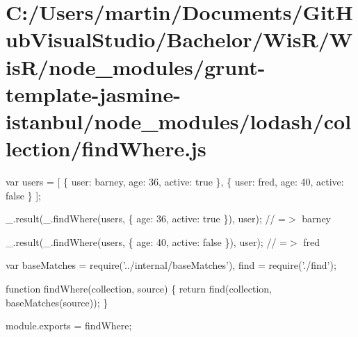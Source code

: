 \hypertarget{_c_1_2_users_2martin_2_documents_2_git_hub_visual_studio_2_bachelor_2_wis_r_2_wis_r_2node_modulebb9a610d07bdfadc7a7de5fedd69f873}{}\section{C\+:/\+Users/martin/\+Documents/\+Git\+Hub\+Visual\+Studio/\+Bachelor/\+Wis\+R/\+Wis\+R/node\+\_\+modules/grunt-\/template-\/jasmine-\/istanbul/node\+\_\+modules/lodash/collection/find\+Where.\+js}
var users = \mbox{[} \{ \textquotesingle{}user\textquotesingle{}\+: \textquotesingle{}barney\textquotesingle{}, \textquotesingle{}age\textquotesingle{}\+: 36, \textquotesingle{}active\textquotesingle{}\+: true \}, \{ \textquotesingle{}user\textquotesingle{}\+: \textquotesingle{}fred\textquotesingle{}, \textquotesingle{}age\textquotesingle{}\+: 40, \textquotesingle{}active\textquotesingle{}\+: false \} \mbox{]};

\+\_\+.\+result(\+\_\+.\+find\+Where(users, \{ \textquotesingle{}age\textquotesingle{}\+: 36, \textquotesingle{}active\textquotesingle{}\+: true \}), \textquotesingle{}user\textquotesingle{}); // =$>$ \textquotesingle{}barney\textquotesingle{}

\+\_\+.\+result(\+\_\+.\+find\+Where(users, \{ \textquotesingle{}age\textquotesingle{}\+: 40, \textquotesingle{}active\textquotesingle{}\+: false \}), \textquotesingle{}user\textquotesingle{}); // =$>$ \textquotesingle{}fred\textquotesingle{}


\begin{DoxyCodeInclude}
var baseMatches = require(\textcolor{stringliteral}{'../internal/baseMatches'}),
    find = require(\textcolor{stringliteral}{'./find'});

\textcolor{keyword}{function} findWhere(collection, source) \{
  \textcolor{keywordflow}{return} find(collection, baseMatches(source));
\}

module.exports = findWhere;
\end{DoxyCodeInclude}
 